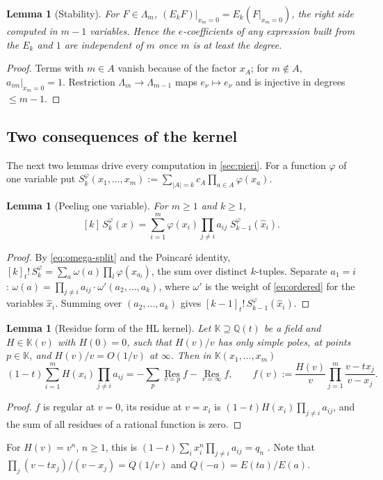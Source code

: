 \documentclass[11pt]{amsart}
\newtheorem{lemma}[theorem]{Lemma}
\theoremstyle{definition}
\theoremstyle{remark}
\numberwithin{equation}{section}
\newcommand{\Lam}{\Lambda}
\newcommand{\Res}{\operatorname*{Res}}
\newcommand{\hx}{\hat x}
\begin{document}
\begin{lemma}[Stability]\label{lem:stable}
For $F\in\Lam_m$, $(E_kF)|_{x_m=0}=E_k(F|_{x_m=0})$, the right side computed in $m-1$ variables. Hence the $e$-coefficients of any expression built from the $E_k$ and $1$ are independent of $m$ once $m$ is at least the degree.
\end{lemma}
\begin{proof}
Terms with $m\in A$ vanish because of the factor $x_A$; for $m\notin A$, $a_{im}|_{x_m=0}=1$. Restriction $\Lam_m\to\Lam_{m-1}$ maps $e_\nu\mapsto e_\nu$ and is injective in degrees $\le m-1$.
\end{proof}

\subsection{Two consequences of the kernel}
The next two lemmas drive every computation in \cref{sec:pieri}. For a function $\varphi$ of one variable put $S^\varphi_k(x_1,\dots,x_m):=\sum_{|A|=k}c_A\prod_{a\in A}\varphi(x_a)$.

\begin{lemma}[Peeling one variable]\label{lem:peel}
For $m\ge1$ and $k\ge1$,
\[ [k]\,S^\varphi_k(x)=\sum_{i=1}^m\varphi(x_i)\prod_{j\neq i}a_{ij}\;S^\varphi_{k-1}(\hx_i). \]
\end{lemma}
\begin{proof}
By \eqref{eq:omega-split} and the Poincar\'e identity, $[k]_t!\,S^\varphi_k=\sum_a\omega(a)\prod_l\varphi(x_{a_l})$, the sum over distinct $k$-tuples. Separate $a_1=i$: $\omega(a)=\prod_{j\neq i}a_{ij}\cdot\omega'(a_2,\dots,a_k)$, where $\omega'$ is the weight of \eqref{eq:ordered} for the variables $\hx_i$. Summing over $(a_2,\dots,a_k)$ gives $[k-1]_t!\,S^\varphi_{k-1}(\hx_i)$.
\end{proof}

\begin{lemma}[Residue form of the HL kernel]\label{lem:res}
Let $\mathbb{K}\supseteq\mathbb{Q}(t)$ be a field and $H\in\mathbb{K}(v)$ with $H(0)=0$, such that $H(v)/v$ has only simple poles, at points $p\in\mathbb{K}$, and $H(v)/v=O(1/v)$ at $\infty$. Then in $\mathbb{K}(x_1,\dots,x_m)$
\[ (1-t)\sum_{i=1}^mH(x_i)\prod_{j\neq i}a_{ij}=-\sum_p\Res_{v=p}f-\Res_{v=\infty}f,\qquad f(v):=\frac{H(v)}{v}\prod_{j=1}^m\frac{v-tx_j}{v-x_j}. \]
\end{lemma}
\begin{proof}
$f$ is regular at $v=0$, its residue at $v=x_i$ is $(1-t)H(x_i)\prod_{j\neq i}a_{ij}$, and the sum of all residues of a rational function is zero.
\end{proof}
For $H(v)=v^n$, $n\ge1$, this is $(1-t)\sum_ix_i^n\prod_{j\ne i}a_{ij}=q_n$ \cite[III (2.9)]{Macdonald95}. Note that $\prod_j(v-tx_j)/(v-x_j)=Q(1/v)$ and $Q(-a)=E(ta)/E(a)$.
\end{document}
